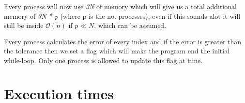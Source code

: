 \documentclass[titlepage, a4paper]{article}
\begin{document}
Every process will now use \textit{3N} of memory which will give us a total additional memory of \textit{3N * p} (where p is the no. processes), even if this sounds alot it will still be inside $\mathcal{O}(n)$ if $p \ll N$, which can be assumed.

Every process calculates the error of every index and if the error is greater than the tolerance then we set a flag which will make the program end the initial while-loop. Only one process is allowed to update this flag at time.

\section{Execution times}
\end{document}
